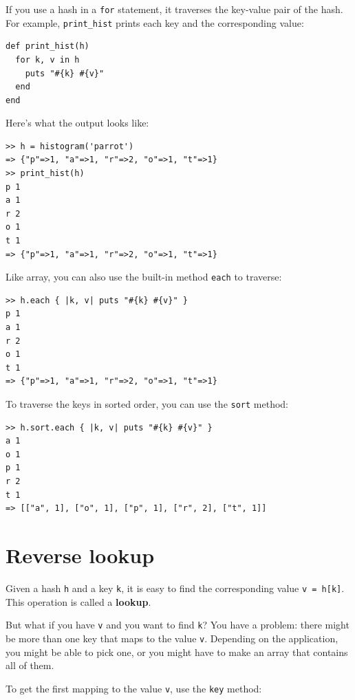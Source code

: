 \documentclass[10pt]{book}
\begin{document}
If you use a hash in a {\tt for} statement, it traverses
the key-value pair of the hash.  For example, \verb"print_hist"
prints each key and the corresponding value:

\begin{verbatim}
def print_hist(h)
  for k, v in h
    puts "#{k} #{v}"
  end
end
\end{verbatim}
%
Here's what the output looks like:

\begin{verbatim}
>> h = histogram('parrot')
=> {"p"=>1, "a"=>1, "r"=>2, "o"=>1, "t"=>1}
>> print_hist(h)
p 1
a 1
r 2
o 1
t 1
=> {"p"=>1, "a"=>1, "r"=>2, "o"=>1, "t"=>1}
\end{verbatim}
%

Like array, you can also use the built-in method {\tt each}
to traverse:

\begin{verbatim}
>> h.each { |k, v| puts "#{k} #{v}" }
p 1
a 1
r 2
o 1
t 1
=> {"p"=>1, "a"=>1, "r"=>2, "o"=>1, "t"=>1}
\end{verbatim}
%

To traverse the keys
in sorted order, you can use the {\tt sort} method:

\begin{verbatim}
>> h.sort.each { |k, v| puts "#{k} #{v}" }
a 1
o 1
p 1
r 2
t 1
=> [["a", 1], ["o", 1], ["p", 1], ["r", 2], ["t", 1]]
\end{verbatim}
%



\section{Reverse lookup}
\label{raise}

Given a hash {\tt h} and a key {\tt k}, it is easy to
find the corresponding value {\tt v = h[k]}.  This operation
is called a {\bf lookup}.

But what if you have {\tt v} and you want to find {\tt k}?
You have a problem: there might be more than one
key that maps to the value {\tt v}.  Depending on the application,
you might be able to pick one, or you might have to make
an array that contains all of them.

To get the first mapping to the value {\tt v}, use the {\tt key} method:
\end{document}
